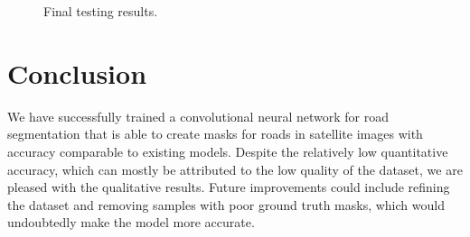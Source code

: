 \documentclass[12pt]{article}
\begin{document}
\begin{figure}[h]
    \centering
    \caption{Final testing results.}
    \label{figure_final_tests}
\end{figure}

\clearpage


\section{Conclusion}
We have successfully trained a convolutional neural network for road segmentation that is able to create masks for roads in satellite images with accuracy comparable to existing models. Despite the relatively low quantitative accuracy, which can mostly be attributed to the low quality of the dataset, we are pleased with the qualitative results. Future improvements could include refining the dataset and removing samples with poor ground truth masks, which would undoubtedly make the model more accurate.


\printbibliography

\end{document}
